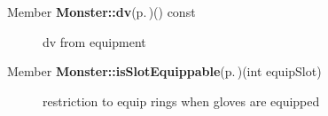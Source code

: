 \label{todo__todo000007}
 \begin{description}
\item[Member {\bf Monster::dv}{\rm (p.\,\pageref{classMonster_a15})}() const  ]dv from equipment

\end{description}


\label{todo__todo000008}
 \begin{description}
\item[Member {\bf Monster::is\-Slot\-Equippable}{\rm (p.\,\pageref{classMonster_a20})}(int equip\-Slot) ]restriction to equip rings when gloves are equipped

\end{description}
